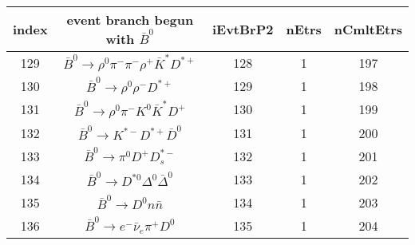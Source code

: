 \documentclass[landscape]{article}
\begin{document}
\begin{table}[htbp!]
\small
\centering
\begin{tabular}{|c|c|c|c|c|}
\hline
index & event branch begun with $ \bar{B}^{0} $ & iEvtBrP2 & nEtrs & nCmltEtrs \\
\hline
129 & $ \bar{B}^{0} \rightarrow \rho^{0} \pi^{-} \pi^{-} \rho^{+} \bar{K}^{*} D^{*+} $ & 128 & 1 & 197 \\
\hline
130 & $ \bar{B}^{0} \rightarrow \rho^{0} \rho^{-} D^{*+} $ & 129 & 1 & 198 \\
\hline
131 & $ \bar{B}^{0} \rightarrow \rho^{0} \pi^{-} K^{0} \bar{K}^{*} D^{+} $ & 130 & 1 & 199 \\
\hline
132 & $ \bar{B}^{0} \rightarrow K^{*-} D^{*+} \bar{D}^{0} $ & 131 & 1 & 200 \\
\hline
133 & $ \bar{B}^{0} \rightarrow \pi^{0} D^{+} D_{s}^{*-} $ & 132 & 1 & 201 \\
\hline
134 & $ \bar{B}^{0} \rightarrow D^{*0} \Delta^{0} \bar{\Delta}^{0} $ & 133 & 1 & 202 \\
\hline
135 & $ \bar{B}^{0} \rightarrow D^{0} n \bar{n} $ & 134 & 1 & 203 \\
\hline
136 & $ \bar{B}^{0} \rightarrow e^{-} \bar{\nu}_{e} \pi^{+} D^{0} $ & 135 & 1 & 204 \\
\hline
\end{tabular}
\end{table}
\end{document}
